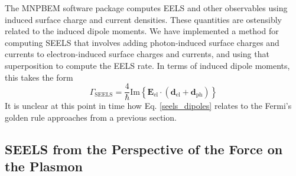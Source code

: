 \documentclass [11pt, proquest] {uwthesis}[2016/11/22]
\begin{document}
The MNPBEM software package computes EELS and other observables using induced surface charge and current densities\cite{Hohenester2012,Hohenester2014}. These quantities are ostensibly related to the induced dipole moments. We have implemented a method for computing SEELS that involves adding photon-induced surface charges and currents to electron-induced surface charges and currents, and using that superposition to compute the EELS rate\cite{vanAiken}. In terms of induced dipole moments, this takes the form
\begin{equation}
\Gamma_{\textrm{SEELS}} = \frac{4}{\hbar}\textrm{Im}\left\{ \textbf{E}_{\textrm{el}} \cdot (\textbf{d}_{\textrm{el}}+\textbf{d}_{\textrm{ph}})\right\}
\label{eels_dipoles}
\end{equation}
It is unclear at this point in time how Eq. \ref{seels_dipoles} relates to the Fermi's golden rule approaches from a previous section.

\subsection{SEELS from the Perspective of the Force on the Plasmon}
\end{document}
